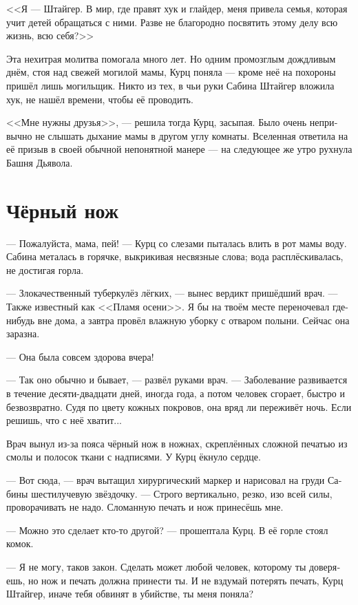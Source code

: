 \documentclass[a4paper,10pt,fleqn]{book}\usepackage{polyglossia}\setdefaultlanguage[babelshorthands=true]{russian}\setotherlanguage{english}\defaultfontfeatures{Ligatures=TeX,Mapping=tex-text}\usepackage{xcolor}\newcommand{\ml}[3]{#2}
\begin{document}
<<Я --- Штайгер.
В мир, где правят хук и глайдер, меня привела семья, которая учит детей обращаться с ними.
Разве не благородно посвятить этому делу всю жизнь, всю себя?>>

Эта нехитрая молитва помогала много лет.
Но одним промозглым дождливым днём, стоя над свежей могилой мамы, Курц поняла --- кроме неё на похороны пришёл лишь могильщик.
Никто из тех, в чьи руки Сабина Штайгер вложила хук, не нашёл времени, чтобы её проводить.

<<Мне нужны друзья>>, --- решила тогда Курц, засыпая.
Было очень непривычно не слышать дыхание мамы в другом углу комнаты.
Вселенная ответила на её призыв в своей обычной непонятной манере --- на следующее же утро рухнула Башня Дьявола.

\section{Чёрный нож}

--- Пожалуйста, мама, пей! --- Курц со слезами пыталась влить в рот мамы воду.
Сабина металась в горячке, выкрикивая несвязные слова;
вода расплёскивалась, не достигая горла.

--- Злокачественный туберкулёз лёгких, --- вынес вердикт пришёдший врач.
--- Также известный как <<Пламя осени>>.
Я бы на твоём месте переночевал где-нибудь вне дома, а завтра провёл влажную уборку с отваром полыни.
Сейчас она заразна.

--- Она была совсем здорова вчера!

--- Так оно обычно и бывает, --- развёл руками врач.
--- Заболевание развивается в течение десяти-двадцати дней, иногда года, а потом человек сгорает, быстро и безвозвратно.
Судя по цвету кожных покровов, она вряд ли переживёт ночь.
Если решишь, что с неё хватит...

Врач вынул из-за пояса чёрный нож в ножнах, скреплённых сложной печатью из смолы и полосок ткани с надписями.
У Курц ёкнуло сердце.

--- Вот сюда, --- врач вытащил хирургический маркер и нарисовал на груди Сабины шестилучевую звёздочку.
--- Строго вертикально, резко, изо всей силы, проворачивать не надо.
Сломанную печать и нож принесёшь мне.

--- Можно это сделает кто-то другой? --- прошептала Курц.
В её горле стоял комок.

--- Я не могу, таков закон.
Сделать может любой человек, которому ты доверяешь, но нож и печать должна принести ты.
И не вздумай потерять печать, Курц Штайгер, иначе тебя обвинят в убийстве, ты меня поняла?
\end{document}
